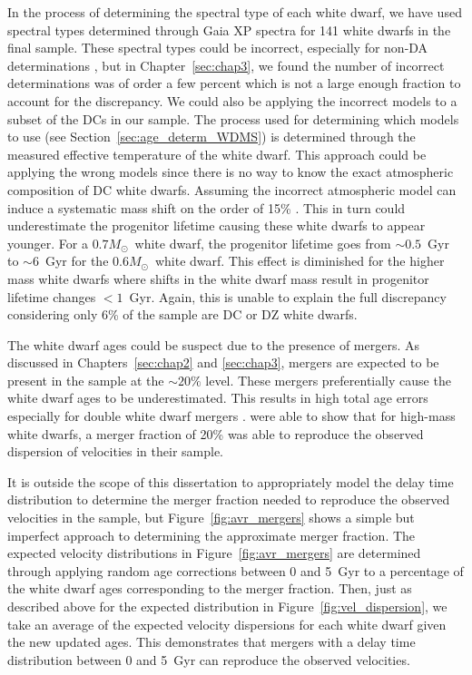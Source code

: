 \documentclass[twocolumn,linenumbers]{aastex631}
\newcommand{\msun}{$M_{\odot}$}
\begin{document}
In the process of determining the spectral type of each white dwarf, we have used spectral types determined through Gaia XP spectra for 141 white dwarfs in the final sample. These spectral types could be incorrect, especially for non-DA determinations \citep{2024ANA...682A...5V}, but in Chapter~\ref{sec:chap3}, we found the number of incorrect determinations was of order a few percent which is not a large enough fraction to account for the discrepancy. We could also be applying the incorrect models to a subset of the DCs in our sample. The process used for determining which models to use (see Section~\ref{sec:age_determ_WDMS}) is determined through the measured effective temperature of the white dwarf. This approach could be applying the wrong models since there is no way to know the exact atmospheric composition of DC white dwarfs. Assuming the incorrect atmospheric model can induce a systematic mass shift on the order of 15\% \citep{2012ApJS..199...29G}. This in turn could underestimate the progenitor lifetime causing these white dwarfs to appear younger. For a $0.7$\msun\ white dwarf, the progenitor lifetime goes from $\sim0.5$~Gyr to $\sim6$~Gyr for the $0.6$\msun\ white dwarf. This effect is diminished for the higher mass white dwarfs where shifts in the white dwarf mass result in progenitor lifetime changes $<1$~Gyr. Again, this is unable to explain the full discrepancy considering only 6\% of the sample are DC or DZ white dwarfs.

The white dwarf ages could be suspect due to the presence of mergers. As discussed in Chapters~\ref{sec:chap2} and \ref{sec:chap3}, mergers are expected to be present in the sample at the $\sim20\%$ level. These mergers preferentially cause the white dwarf ages to be underestimated. This results in high total age errors especially for double white dwarf mergers \citep[e.g.,][]{2014MNRAS.441..354T, 2020A&A...636A..31T}. \cite{2020ApJ...891..160C} were able to show that for high-mass white dwarfs, a merger fraction of 20\% was able to reproduce the observed dispersion of velocities in their sample. 

It is outside the scope of this dissertation to appropriately model the delay time distribution to determine the merger fraction needed to reproduce the observed velocities in the sample, but Figure~\ref{fig:avr_mergers} shows a simple but imperfect approach to determining the approximate merger fraction. The expected velocity distributions in Figure~\ref{fig:avr_mergers} are determined through applying random age corrections between 0 and 5~Gyr to a percentage of the white dwarf ages corresponding to the merger fraction. Then, just as described above for the expected distribution in Figure~\ref{fig:vel_dispersion}, we take an average of the expected velocity dispersions for each white dwarf given the new updated ages. This demonstrates that mergers with a delay time distribution between 0 and 5~Gyr can reproduce the observed velocities.
\end{document}
